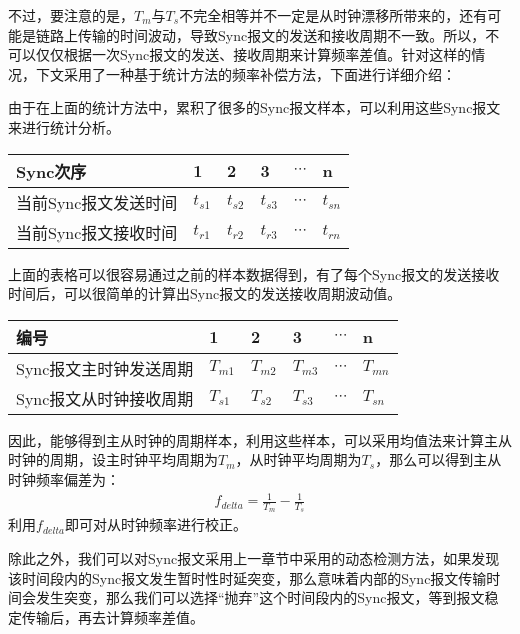 不过，要注意的是，$T_{m}$与$T_{s}$不完全相等并不一定是从时钟漂移所带来的，还有可能是链路上传输的时间波动，导致Sync报文的发送和接收周期不一致。所以，不可以仅仅根据一次Sync报文的发送、接收周期来计算频率差值。针对这样的情况，下文采用了一种基于统计方法的频率补偿方法，下面进行详细介绍：

由于在上面的统计方法中，累积了很多的Sync报文样本，可以利用这些Sync报文来进行统计分析。
\begin{table}[htpb]
  \centering
  \begin{tabular}{llllll} \toprule
    Sync次序 & 1 & 2 & 3 & $\cdots$ & n \\ \midrule
    当前Sync报文发送时间 & $t_{s1}$ & $t_{s2}$ & $t_{s3}$ & $\cdots$ & $t_{sn}$ \\ \midrule
    当前Sync报文接收时间 & $t_{r1}$ & $t_{r2}$ & $t_{r3}$ & $\cdots$ & $t_{rn}$  \\ \bottomrule
  \end{tabular}
\end{table}

上面的表格可以很容易通过之前的样本数据得到，有了每个Sync报文的发送接收时间后，可以很简单的计算出Sync报文的发送接收周期波动值。
\begin{table}[htpb]
  \centering
  \begin{tabular}{llllll} \toprule
    编号 & 1 & 2 & 3 & $\cdots$ & n \\ \midrule
    Sync报文主时钟发送周期 & $T_{m1}$ & $T_{m2}$ & $T_{m3}$ & $\cdots$ & $T_{mn}$ \\ \midrule
    Sync报文从时钟接收周期 & $T_{s1}$ & $T_{s2}$ & $T_{s3}$ & $\cdots$ & $T_{sn}$  \\ \bottomrule
  \end{tabular}
\end{table}

因此，能够得到主从时钟的周期样本，利用这些样本，可以采用均值法来计算主从时钟的周期，设主时钟平均周期为$T_{m}$，从时钟平均周期为$T_{s}$，那么可以得到主从时钟频率偏差为：
\begin {align}
f_{delta} = \frac{1}{T_{m}} - \frac{1}{T_{s}}
\end{align}
利用$f_{delta}$即可对从时钟频率进行校正。

除此之外，我们可以对Sync报文采用上一章节中采用的动态检测方法，如果发现该时间段内的Sync报文发生暂时性时延突变，那么意味着内部的Sync报文传输时间会发生突变，那么我们可以选择“抛弃”这个时间段内的Sync报文，等到报文稳定传输后，再去计算频率差值。

